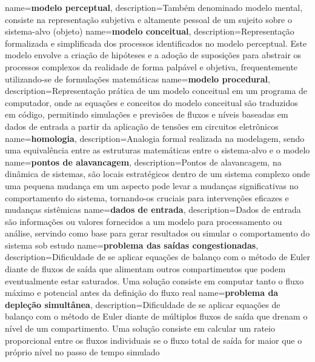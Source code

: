 {
    name=\textbf{modelo perceptual},
    description={Também denominado modelo mental, consiste na representação subjetiva e altamente pessoal de um sujeito sobre o sistema-alvo (objeto)}
}
{
    name=\textbf{modelo conceitual},
    description={Representação formalizada e simplificada dos processos identificados no modelo perceptual. Este modelo envolve a criação de hipóteses e a adoção de suposições para abstrair os processos complexos da realidade de forma palpável e objetiva, frequentemente utilizando-se de formulações matemáticas}
}
{
    name=\textbf{modelo procedural},
    description={Representação prática de um modelo conceitual em um programa de computador, onde as equações e conceitos do modelo conceitual são traduzidos em código, permitindo simulações e previsões de fluxos e níveis baseadas em dados de entrada a partir da aplicação de tensões em circuitos eletrônicos}
}
{
    name=\textbf{homologia},
    description={Analogia formal realizada na modelagem, sendo uma equivalência entre as estruturas matemáticas entre o sistema-alvo e o modelo}
}
{
    name=\textbf{pontos de alavancagem},
    description={Pontos de alavancagem, na dinâmica de sistemas, são locais estratégicos dentro de um sistema complexo onde uma pequena mudança em um aspecto pode levar a mudanças significativas no comportamento do sistema, tornando-os cruciais para intervenções eficazes e mudanças sistêmicas}
}
{
    name=\textbf{dados de entrada},
    description={Dados de entrada são informações ou valores fornecidos a um modelo para processamento ou análise, servindo como base para gerar resultados ou simular o comportamento do sistema sob estudo}
}
{
    name=\textbf{problema das saídas congestionadas},
    description={Dificuldade de se aplicar equações de balanço com o método de Euler diante de fluxos de saída que alimentam outros compartimentos que podem eventualmente estar saturados. Uma solução consiste em computar tanto o fluxo máximo e potencial antes da definição do fluxo real}
}
{
    name=\textbf{problema da depleção simultânea},
    description={Dificuldade de se aplicar equações de balanço com o método de Euler diante de múltiplos fluxos de saída que drenam o nível de um compartimento. Uma solução consiste em calcular um rateio proporcional entre os fluxos individuais se o fluxo total de saída for maior que o próprio nível no passo de tempo simulado}
}
